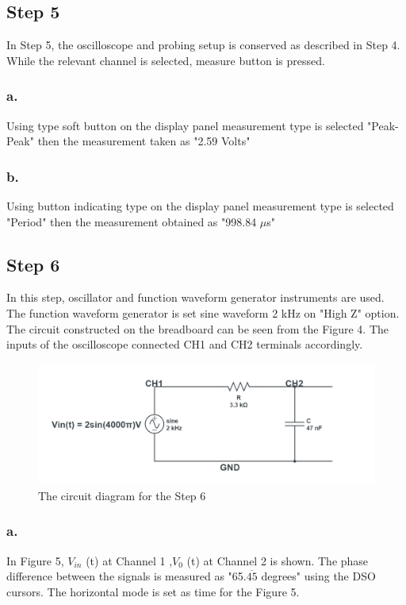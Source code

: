 \documentclass[letterpaper,12pt]{article}
\begin{document}
\subsection{Step 5}
In Step 5, the oscilloscope and probing setup is conserved as described in Step 4. While the relevant channel is selected, measure button is pressed.
\subsubsection{a.}
Using type soft  button on the display panel measurement type is selected "Peak-Peak" then the measurement taken as "2.59 Volts"
\subsubsection{b.}
Using button indicating type on the display panel measurement type is selected "Period" then the measurement obtained as "998.84 \(\mu\)s"
\subsection{Step 6}
In this step, oscillator and function waveform generator instruments are used. The function waveform generator is set sine waveform 2 kHz on "High Z" option. The circuit constructed on the breadboard can be seen from the Figure 4. The inputs of the oscilloscope connected CH1 and CH2 terminals accordingly.
\begin{figure}[h]
	\caption{The circuit diagram for the Step 6}
	\centering
	\includegraphics[width=1\textwidth]{6circuit.png}
\end{figure}

\subsubsection{a.}
In Figure 5, \( V_{in}\) (t) at Channel 1 ,\( V_0 \) (t) at Channel 2 is shown. The phase difference between the signals is measured as "65.\(\overline{45}\)  degrees" using the DSO cursors. The horizontal mode is set as time for the Figure 5.
\end{document}

